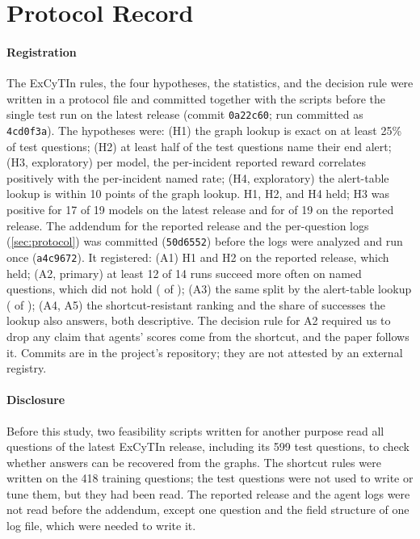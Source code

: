 \section{Protocol Record}
\label{app:protocol}

\paragraph{Registration} The ExCyTIn rules, the four hypotheses, the statistics, and the decision rule were written in a protocol file and committed together with the scripts before the single test run on the latest release (commit \texttt{0a22c60}; run committed as \texttt{4cd0f3a}). The hypotheses were: (H1) the graph lookup is exact on at least 25\% of test questions; (H2) at least half of the test questions name their end alert; (H3, exploratory) per model, the per-incident reported reward correlates positively with the per-incident named rate; (H4, exploratory) the alert-table lookup is within 10 points of the graph lookup. H1, H2, and H4 held; H3 was positive for 17 of 19 models on the latest release and for \oHPos{} of 19 on the reported release. The addendum for the reported release and the per-question logs (\cref{sec:protocol}) was committed (\texttt{50d6552}) before the logs were analyzed and run once (\texttt{a4c9672}). It registered: (A1) H1 and H2 on the reported release, which held; (A2, primary) at least 12 of 14 runs succeed more often on named questions, which did not hold (\lgPos{} of \lgModels); (A3) the same split by the alert-table lookup (\lgTPos{} of \lgModels); (A4, A5) the shortcut-resistant ranking and the share of successes the lookup also answers, both descriptive. The decision rule for A2 required us to drop any claim that agents' scores come from the shortcut, and the paper follows it. Commits are in the project's repository; they are not attested by an external registry.

\paragraph{Disclosure} Before this study, two feasibility scripts written for another purpose read all questions of the latest ExCyTIn release, including its 599 test questions, to check whether answers can be recovered from the graphs. The shortcut rules were written on the 418 training questions; the test questions were not used to write or tune them, but they had been read. The reported release and the agent logs were not read before the addendum, except one question and the field structure of one log file, which were needed to write it.

